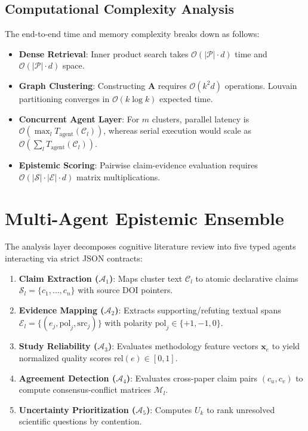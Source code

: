 \documentclass[conference]{IEEEtran}
\begin{document}
\subsection{Computational Complexity Analysis}
The end-to-end time and memory complexity breaks down as follows:
\begin{itemize}
\item \textbf{Dense Retrieval}: Inner product search takes $\mathcal{O}(|\mathcal{P}| \cdot d)$ time and $\mathcal{O}(|\mathcal{P}| \cdot d)$ space.
\item \textbf{Graph Clustering}: Constructing $\mathbf{A}$ requires $\mathcal{O}(k^2 d)$ operations. Louvain partitioning converges in $\mathcal{O}(k \log k)$ expected time.
\item \textbf{Concurrent Agent Layer}: For $m$ clusters, parallel latency is $\mathcal{O}(\max_{l} T_{\mathrm{agent}}(\mathcal{C}_l))$, whereas serial execution would scale as $\mathcal{O}(\sum_{l} T_{\mathrm{agent}}(\mathcal{C}_l))$.
\item \textbf{Epistemic Scoring}: Pairwise claim-evidence evaluation requires $\mathcal{O}(|\mathcal{S}| \cdot |\mathcal{E}| \cdot d)$ matrix multiplications.
\end{itemize}

\section{Multi-Agent Epistemic Ensemble}
The analysis layer decomposes cognitive literature review into five typed agents
interacting via strict JSON contracts:
\begin{enumerate}
\item \textbf{Claim Extraction ($\mathcal{A}_1$)}: Maps cluster text $\mathcal{C}_l$ to atomic declarative claims $\mathcal{S}_l = \{c_1, \dots, c_n\}$ with source DOI pointers.
\item \textbf{Evidence Mapping ($\mathcal{A}_2$)}: Extracts supporting/refuting textual spans $\mathcal{E}_l = \{(e_j, \mathrm{pol}_j, \mathrm{src}_j)\}$ with polarity $\mathrm{pol}_j \in \{+1, -1, 0\}$.
\item \textbf{Study Reliability ($\mathcal{A}_3$)}: Evaluates methodology feature vectors $\mathbf{x}_e$ to yield normalized quality scores $\mathrm{rel}(e) \in [0,1]$.
\item \textbf{Agreement Detection ($\mathcal{A}_4$)}: Evaluates cross-paper claim pairs $(c_u, c_v)$ to compute consensus-conflict matrices $\mathcal{M}_l$.
\item \textbf{Uncertainty Prioritization ($\mathcal{A}_5$)}: Computes $U_k$ to rank unresolved scientific questions by contention.
\end{enumerate}
\end{document}
